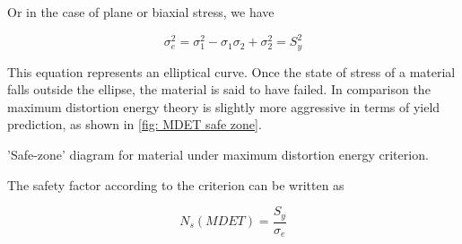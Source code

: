 \documentclass[
fontsize=10pt,
a4paper,
twosides=false,
open=any,
svgnames,
]{kaobook} %
\begin{document}
Or in the case of plane or biaxial stress, we have

\begin{equation}
  \sigma_e^2 = \sigma_1^2 - \sigma_1\sigma_2 + \sigma_2^2 = S_y^2
\end{equation}

This equation represents an elliptical curve. Once the state of stress of a material falls outside the ellipse, the material is said to have failed.
In comparison the maximum distortion energy theory is slightly more aggressive in terms of yield prediction, as shown in \cref{fig: MDET safe zone}.

\begin{marginfigure}
  \centering
  \caption{'Safe-zone' diagram for material under maximum distortion energy criterion.}
  \label{fig: MDET safe zone}
\end{marginfigure}

The safety factor according to the criterion can be written as

\begin{equation}
  N_s(MDET) = \frac{S_y}{\sigma_e}
\end{equation}
\end{document}
